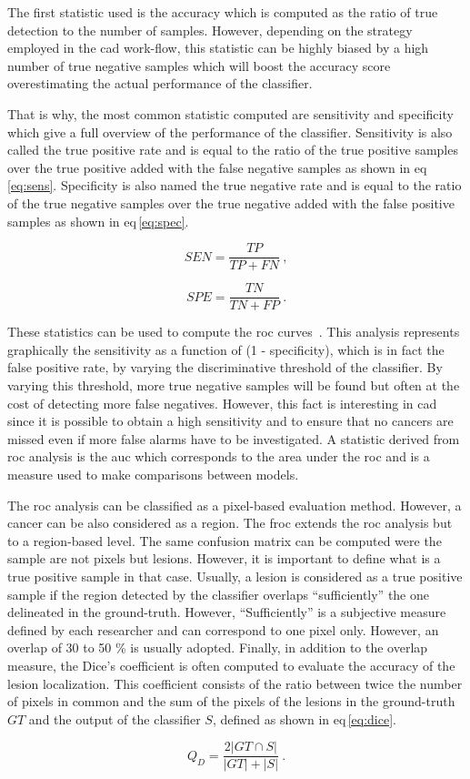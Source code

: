 The first statistic used is the accuracy which is computed as the ratio of true detection to the number of samples. However, depending on the strategy employed in the \ac{cad} work-flow, this statistic can be highly biased by a high number of true negative samples which will boost the accuracy score overestimating the actual performance of the classifier.

That is why, the most common statistic computed are sensitivity and specificity which give a full overview of the performance of the classifier. Sensitivity is also called the true positive rate and is equal to the ratio of the true positive samples over the true positive added with the false negative samples as shown in \acs{eq}\,\eqref{eq:sens}. Specificity is also named the true negative rate and is equal to the ratio of the true negative samples over the true negative added with the false positive samples as shown in \acs{eq}\,\eqref{eq:spec}.

\begin{equation}
  SEN = \frac{TP}{TP+FN} \ ,
  \label{eq:sens}
\end{equation}

\begin{equation}
  SPE = \frac{TN}{TN+FP} \ .
  \label{eq:spec}
\end{equation}

These statistics can be used to compute the \acf{roc} curves~\cite{Metz2006}. This analysis represents graphically the sensitivity as a function of (1 - specificity), which is in fact the false positive rate, by varying the discriminative threshold of the classifier. By varying this threshold, more true negative samples will be found but often at the cost of detecting more false negatives. However, this fact is interesting in \ac{cad} since it is possible to obtain a high sensitivity and to ensure that no cancers are missed even if more false alarms have to be investigated. A statistic derived from \ac{roc} analysis is the \acf{auc} which corresponds to the area under the \ac{roc} and is a measure used to make comparisons between models.

The \ac{roc} analysis can be classified as a pixel-based evaluation method. However, a cancer can be also considered as a region. The \acf{froc} extends the \ac{roc} analysis but to a region-based level. The same confusion matrix can be computed were the sample are not pixels but lesions. However, it is important to define what is a true positive sample in that case. Usually, a lesion is considered as a true positive sample if the region detected by the classifier overlaps ``sufficiently'' the one delineated in the ground-truth. However, ``Sufficiently'' is a subjective measure defined by each researcher and can correspond to one pixel only. However, an overlap of 30 to 50 \% is usually adopted.
Finally, in addition to the overlap measure, the Dice's coefficient is often computed to evaluate the accuracy of the lesion localization. This coefficient consists of the ratio between twice the number of pixels in common and the sum of the pixels of the lesions in the ground-truth $GT$ and the output of the classifier $S$, defined as shown in \acs{eq}\,\eqref{eq:dice}.

\begin{equation}
  Q_D = \frac{2 | GT \cap S |}{| GT | + | S |} \ .
  \label{eq:dice}
\end{equation}

